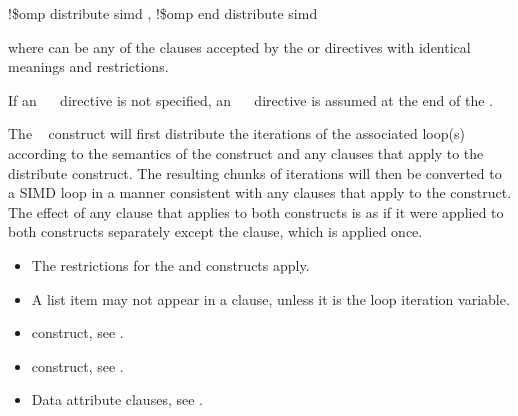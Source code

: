 {{{{\fortranspecificstart
\begin{boxedcode}
!\$omp distribute simd \plc{[clause[ [},\plc{] clause] ... ]}
\plc{[}!\$omp end distribute simd\plc{]}
\end{boxedcode}

where  can be any of the clauses accepted by the  or  
directives with identical meanings and restrictions.

If an ~~ directive is not specified, an ~~
directive is assumed at the end of the .
\fortranspecificend

\descr
The ~ construct will first distribute the iterations of the associated 
loop(s) according to the semantics of the  construct and any clauses that 
apply to the distribute construct. The resulting chunks of iterations will then be 
converted to a SIMD loop in a manner consistent with any clauses that apply to the 
 construct. The effect of any clause that applies to both constructs is as if it were applied to both constructs separately except the  clause, which is applied once.

\restrictions
\begin{itemize}
\item The restrictions for the  and  constructs apply.

\item A list item may not appear in a  clause, unless it is the loop iteration variable.
\end{itemize}

\crossreferences
\begin{itemize}
\item {} construct, see 
.

\item {} construct, see 
.

\item Data attribute clauses, see 
.
\end{itemize}









}}}}
